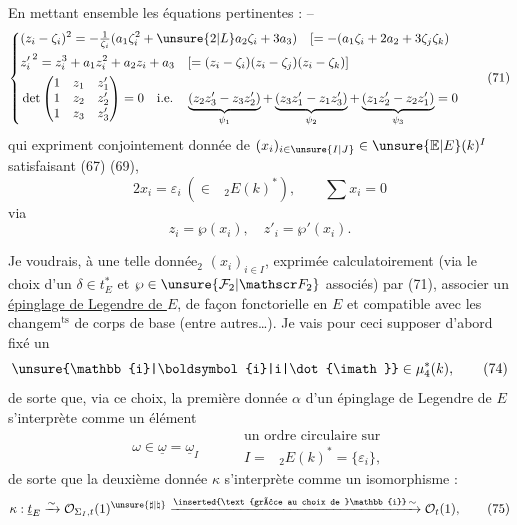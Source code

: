 En mettant ensemble les équations pertinentes : --
\[
 \left\{\begin{aligned}
 &(z_i-\zeta_i)^2=-\tfrac1{\zeta_i}(a_1\zeta_i^2+\unsure{2|L}a_2\zeta_i+3a_3)\quad [=-(a_1\zeta_i+2a_2+3\zeta_j\zeta_k)\\
 &{z'_i}^{\,2}=z_i^3+a_1z_i^2+a_2z_i+a_3\quad [=(z_i-\zeta_i)(z_i-\zeta_j)(z_i-\zeta_k)]\\
 &\det\begin{pmatrix}1&z_1&z'_1\\1&z_2&z'_2\\1&z_3&z'_3\end{pmatrix}=0\quad\text{i.e.}\quad
 \underbrace{(z_2z'_3-z_3z'_2)}_{\psi_1}+\underbrace{(z_3z'_1-z_1z'_3)}_{\psi_2}+\underbrace{(z_1z'_2-z_2z'_1)}_{\psi_3}=0
 \end{aligned}\right. \tag*{(71)}
\]
\margin{\uline{NB.} $[\psi_i^\omega=z_jz'_k-z_kz'_j\quad j=\omega i,\ k=\omega^2i=\omega j$}
qui expriment conjointement  donnée de $(x_i)_{i\in\unsure{I|J}}\in\unsure{\mathbb{E}|E}(k)^I$ satisfaisant (67) (69),
\[
 2x_i=\varepsilon_i\ (\in\phantom{E}_2E(k)^*),\qquad \sum x_i=0 \tag*{(72)}
\]
via
\[
 z_i=\wp(x_i),\quad z'_i=\wp'(x_i). \tag*{(73)}
\]

Je voudrais, à une telle donnée$_2$ $(x_i)_{i\in I}$, exprimée calculatoirement (via le choix d'un $\delta\in t_E^*$ et $\wp\in\unsure{\mathcal F_2|\mathscr F_2}$ associés) par (71), associer  un \uline{épinglage de Legendre de $E$}, de façon fonctorielle en $E$ et compatible avec les changem$^{\mathrm{ts}}$ de corps de base (entre autres\ldots). Je vais pour ceci supposer d'abord fixé un
\[
 \unsure{\mathbb{i}|\boldsymbol{i}|i|\dot{\imath}}\in\mu_4^*(k), \tag*{(74)}
\]
de sorte que, via ce choix, la première donnée $\alpha$ d'un épinglage de Legendre de $E$ s'interprète comme un élément
\[
 \omega\in\underline{\omega}=\underline{\omega}_I\qquad
 \begin{aligned}&\text{un ordre circulaire sur}\\ &I=\phantom{E}_2E(k)^*=\{\varepsilon_i\},\end{aligned}
 \tag*{(75)}
\]
de sorte que la deuxième donnée $\kappa$ s'interprète comme un isomorphisme :
\[
 \kappa:\underline{t}_E\xrightarrow{\sim}\mathcal O_{\Sigma_I,t}(1)^{\unsure{\sharp|\natural}}
 \xrightarrow[\ ]{\inserted{\text{grâce au choix de }\mathbb{i}}\,\sim}\mathcal O_t(1),\tag*{(75)}
\]
